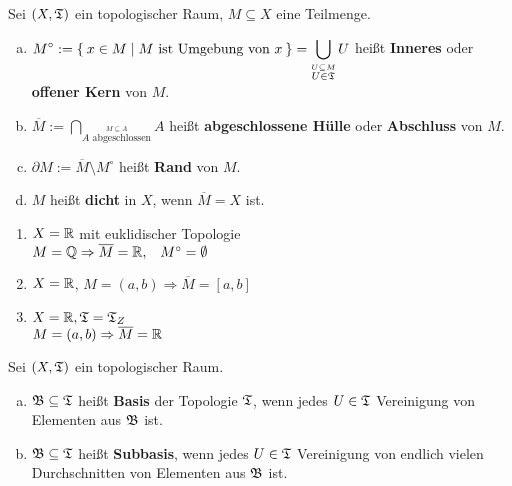 \begin{definition}
    Sei $(X, \mathfrak{T})$ ein topologischer Raum, $M \subseteq X$ eine Teilmenge.
    \begin{enumerate}[a)]
        \item $\displaystyle M^\circ := \Set{x \in M | M \text{ ist Umgebung von } x} = \bigcup_{\stackrel{U \subseteq M} {U \in \mathfrak{T}}} U $ heißt \textbf{Inneres} oder \textbf{ offener Kern} von $M$.  
        \item $\displaystyle \overline{M} := \bigcap_{\stackrel{M \subseteq A}{A \text{ abgeschlossen}}} A$ heißt \textbf{abgeschlossene Hülle} oder \textbf{Abschluss} von $M$. 
        \item $\partial M := \overline{M} \setminus M^\circ$ heißt \textbf{Rand} von $M$. 
        \item $M$ heißt \textbf{dicht} in $X$, wenn $\overline{M} = X$ ist. 
    \end{enumerate}
\end{definition}

\begin{beispiel}
    \begin{enumerate}[1)]
        \item $X = \mathbb{R}$ mit euklidischer Topologie\\
              $M = \mathbb{Q} \Rightarrow \overline{M} = \mathbb{R}, \;\;\; M^\circ = \emptyset$
        \item $X = \mathbb{R}$, $M=(a,b) \Rightarrow \overline{M} = [a,b]$
        \item $X = \mathbb{R}, \mathfrak{T} = \mathfrak{T}_Z$\\
              $M = (a,b) \Rightarrow \overline{M} = \mathbb{R}$
    \end{enumerate}
\end{beispiel}

\begin{definition}  
    Sei $(X, \mathfrak{T})$ ein topologischer Raum.
    \begin{enumerate}[a)]
        \item $\mathfrak{B} \subseteq \mathfrak{T}$ heißt \textbf{Basis} der Topologie $\mathfrak{T}$,
              wenn jedes $U \in \mathfrak{T}$ Vereinigung von Elementen aus $\mathfrak{B}$
              ist.
        \item $\mathfrak{B} \subseteq \mathfrak{T}$ heißt \textbf{Subbasis}, wenn jedes
              $U \in \mathfrak{T}$ Vereinigung von endlich vielen Durchschnitten
              von Elementen aus $\mathfrak{B}$ ist.
    \end{enumerate}
\end{definition}

